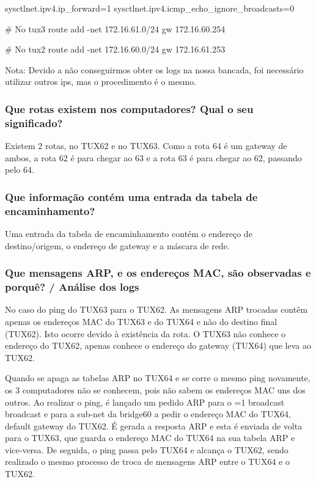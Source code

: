 \documentclass[11pt,a4paper]{article}
\newcommand{\hl}[2][1]{%
  \ifnum#1=1\relax
    \textcolor{text-hl1}{#2}%
  \else
    \textcolor{text-hl2}{#2}%
  \fi
}
\begin{document}
\begin{multicols}{2}
\begin{bash-darktheme}
        sysctlnet.ipv4.ip_forward=1
        sysctlnet.ipv4.icmp_echo_ignore_broadcasts=0
        
        # No tux3
        route add -net 172.16.61.0/24 gw 172.16.60.254
        
        # No tux2
        route add -net 172.16.60.0/24 gw 172.16.61.253

\end{bash-darktheme}

Nota: Devido a não conseguirmos obter os logs na nossa bancada, foi necessário utilizar outros ips, mas o procedimento é o mesmo.

\subsubsection{Que rotas existem nos computadores? Qual o seu significado?}
    
Existem 2 rotas, no TUX62 e no TUX63. Como a rota 64 é um gateway de ambos, a rota 62 é para chegar ao 63 e a rota 63 é para chegar ao 62, passando pelo 64. 

\subsubsection{Que informação contém uma entrada da tabela de encaminhamento?}

Uma entrada da tabela de encaminhamento contém o endereço de destino/origem, o endereço de gateway e a máscara de rede.

\subsubsection{ Que mensagens ARP, e os endereços MAC, são observadas e porquê? / Análise dos logs} 


No caso do ping do TUX63 para o TUX62. As mensagens ARP trocadas contêm apenas os endereços MAC do TUX63 e do TUX64 e não do destino final (TUX62). Isto ocorre devido à existência da rota. O TUX63 não conhece o endereço do TUX62, apenas conhece o endereço do gateway (TUX64) que leva ao TUX62.

Quando se apaga as tabelas ARP no TUX64 e se corre o mesmo ping novamente, os 3 computadores não se conhecem, pois não sabem os endereços MAC uns dos outros. Ao realizar o ping, é lançado um pedido ARP para o \hl{broadcast} e para a sub-net da bridge60 a pedir o endereço MAC do TUX64, default gateway do TUX62. É gerada a resposta ARP e esta é enviada de volta para o TUX63, que guarda o endereço MAC do TUX64 na sua tabela ARP e vice-versa. 
De seguida, o ping passa pelo TUX64 e alcança o TUX62, sendo realizado o mesmo processo de troca de mensagens ARP entre o TUX64 e o TUX62.


\end{multicols}
\end{document}
